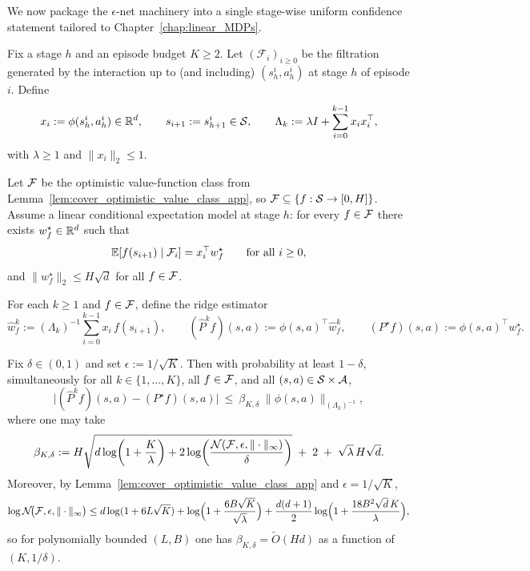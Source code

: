 \medskip
We now package the $\epsilon$-net machinery into a single stage-wise uniform confidence statement
tailored to Chapter~\ref{chap:linear_MDPs}.

\begin{corollary}
\label{cor:uniform_model_conf_bonus_class}
Fix a stage $h$ and an episode budget $K\ge 2$.  Let $(\mathcal{F}_i)_{i\ge 0}$ be the filtration
generated by the interaction up to (and including) $(s_h^i,a_h^i)$ at stage $h$ of episode $i$.
Define
\[
x_i := \phi(s_h^i,a_h^i)\in\mathbb{R}^d,
\qquad
s_{i+1} := s_{h+1}^i\in\mathcal{S},
\qquad
\Lambda_k := \lambda I + \sum_{i=0}^{k-1} x_i x_i^\top,
\]
with $\lambda\ge 1$ and $\|x_i\|_2\le 1$.

Let $\mathcal{F}$ be the optimistic value-function class from Lemma~\ref{lem:cover_optimistic_value_class_app},
so $\mathcal{F}\subseteq\{f:\mathcal{S}\to[0,H]\}$.  Assume a linear conditional expectation model at stage $h$:
for every $f\in\mathcal{F}$ there exists $w_f^\star\in\mathbb{R}^d$ such that
\begin{equation}\label{eq:linear_model_stage_h}
\mathbb{E}\!\left[f(s_{i+1})\mid \mathcal{F}_i\right] = x_i^\top w_f^\star
\qquad\text{for all }i\ge 0,
\end{equation}
and $\|w_f^\star\|_2\le H\sqrt d$ for all $f\in\mathcal{F}$.

For each $k\ge 1$ and $f\in\mathcal{F}$, define the ridge estimator
\[
\widehat w_f^k := (\Lambda_k)^{-1}\sum_{i=0}^{k-1} x_i\,f(s_{i+1}),
\qquad
(\widehat P^k f)(s,a) := \phi(s,a)^\top \widehat w_f^k,
\qquad
(P^\star f)(s,a) := \phi(s,a)^\top w_f^\star.
\]

Fix $\delta\in(0,1)$ and set $\epsilon := 1/\sqrt{K}$.
Then with probability at least $1-\delta$, simultaneously for all $k\in\{1,\dots,K\}$,
all $f\in\mathcal{F}$, and all $(s,a)\in\mathcal{S}\times\mathcal{A}$,
\[
\big|(\widehat P^k f)(s,a) - (P^\star f)(s,a)\big|
\ \le\
\beta_{K,\delta}\;\|\phi(s,a)\|_{(\Lambda_k)^{-1}},
\]
where one may take
\[
\beta_{K,\delta}
:=
H\sqrt{
d\log\!\left(1+\frac{K}{\lambda}\right)
+
2\log\!\left(\frac{\mathcal{N}(\mathcal{F},\epsilon,\|\cdot\|_\infty)}{\delta}\right)
}
\;+\;
2
\;+\;
\sqrt{\lambda}\,H\sqrt d.
\]
Moreover, by Lemma~\ref{lem:cover_optimistic_value_class_app} and $\epsilon=1/\sqrt K$,
\[
\log \mathcal{N}\!\big(\mathcal{F},\epsilon,\|\cdot\|_\infty\big)
\le
d\log(1+6L\sqrt K)
+\log\!\Big(1+\frac{6B\sqrt K}{\sqrt{\lambda}}\Big)
+\frac{d(d+1)}{2}\log\!\Big(1+\frac{18B^2\sqrt d\,K}{\lambda}\Big),
\]
so for polynomially bounded $(L,B)$ one has $\beta_{K,\delta}=\widetilde O(Hd)$ as a function
of $(K,1/\delta)$.
\end{corollary}

